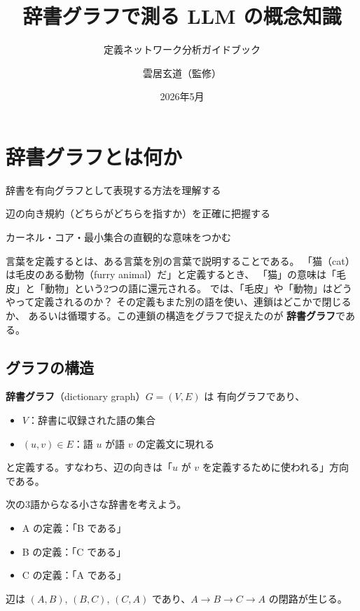 \documentclass[lang=jp, color=black, mode=simple, 11pt]{elegantbook}
\title{辞書グラフで測る LLM の概念知識}
\subtitle{定義ネットワーク分析ガイドブック}
\author{雲居玄道（監修）}
\institute{長岡技術科学大学 機械学習研究室}
\date{2026年5月}
\begin{document}
\maketitle
{}
\tableofcontents
\clearpage
{}
\setcounter{page}{1}

\chapter{辞書グラフとは何か}

\begin{introduction}[この章で学ぶこと]
  \item 辞書を有向グラフとして表現する方法を理解する
  \item 辺の向き規約（どちらがどちらを指すか）を正確に把握する
  \item カーネル・コア・最小集合の直観的な意味をつかむ
\end{introduction}

言葉を定義するとは、ある言葉を別の言葉で説明することである。
「猫（cat）は毛皮のある動物（furry animal）だ」と定義するとき、
「猫」の意味は「毛皮」と「動物」という2つの語に還元される。
では、「毛皮」や「動物」はどうやって定義されるのか？
その定義もまた別の語を使い、連鎖はどこかで閉じるか、
あるいは循環する。この連鎖の構造をグラフで捉えたのが
\textbf{辞書グラフ}である。

\section{グラフの構造}

\begin{definition}[辞書グラフ]
  \textbf{辞書グラフ}（dictionary graph）$G = (V, E)$ は
  有向グラフであり、
  \begin{itemize}
    \item $V$：辞書に収録された語の集合
    \item $(u, v) \in E$：語 $u$ が語 $v$ の定義文に現れる
  \end{itemize}
  と定義する。すなわち、辺の向きは「$u$ が $v$ を定義するために使われる」方向である。
\end{definition}

\begin{example}
  次の3語からなる小さな辞書を考えよう。
  \begin{itemize}
    \item A の定義：「B である」
    \item B の定義：「C である」
    \item C の定義：「A である」
  \end{itemize}
  辺は $(A, B)$, $(B, C)$, $(C, A)$ であり、$A \to B \to C \to A$ の閉路が生じる。
\end{example}
\end{document}
